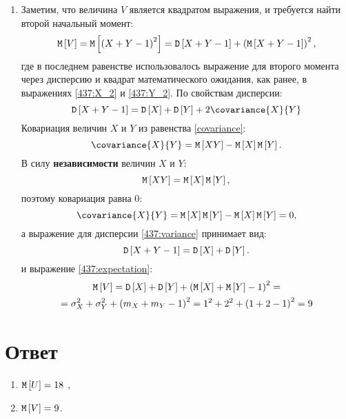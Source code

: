 \documentclass[a4paper,12pt]{article}
\begin{document}
\begin{enumerate}
        \item Заметим, что величина $V$ является квадратом выражения, и требуется найти второй начальный момент:
        \begin{equation}
            \label{437:expectation}
            \mathtt{M} \left [ V \right ] = \mathtt{M} \left [ \left ( X + Y - 1 \right )^2 \right ] = \mathtt{D} \left [ X + Y - 1 \right ] + \left ( \mathtt{M} \left [ X + Y - 1 \right ] \right )^2 ,
        \end{equation}
        где в последнем равенстве использовалось выражение для второго момента через дисперсию и квадрат математического ожидания, как ранее, в выражениях \eqref{437:X_2}
        и \eqref{437:Y_2}.
        По свойствам дисперсии:
        \begin{equation}
            \label{437:variance}
            \variance{X + Y - 1} = \variance{X} + \variance{Y} + 2 \covariance{X}{Y}
        \end{equation}
        Ковариация величин $X$ и $Y$ из равенства \eqref{covariance}:
        \begin{equation}
            \covariance{X}{Y} = \expectation{XY} - \expectation{X} \expectation{Y}.
        \end{equation}
        В силу \textbf{независимости} величин $X$ и $Y$:
        \begin{equation}
            \mathtt{M} \left [ XY \right ] = \mathtt{M} \left [ X \right ] \mathtt{M} \left [ Y \right ] ,
        \end{equation}
        поэтому ковариация равна 0:
        \begin{equation}
            \covariance{X}{Y} = \expectation{X} \expectation{Y} - \expectation{X} \expectation{Y} = 0 ,
        \end{equation}
        а выражение для дисперсии \eqref{437:variance} принимает вид:
        \begin{equation}
            \mathtt{D} \left [ X + Y - 1 \right ] = \mathtt{D} \left [ X \right ] + \mathtt{D} \left [ Y \right ] .
        \end{equation}
        и выражение \eqref{437:expectation}:
        \begin{multline}
            \mathtt{M} \left [ V \right ]
            = \mathtt{D} \left [ X \right ] + \mathtt{D} \left [ Y \right ] + \left ( \mathtt{M} \left [ X \right ] + \mathtt{M} \left [ Y \right ] - 1 \right )^2 = \\
            = \sigma_X^2 + \sigma_Y^2 + \left ( m_X + m_Y - 1 \right )^2
            = 1^2
            + 2^2 + \left ( 1 + 2 - 1 \right )^2
            = 9
        \end{multline}
    \end{enumerate}
    \section*{Ответ}
    \begin{enumerate}
        \item $\mathtt{M} \left [ U \right ] = 18$ ,
        \item $\mathtt{M} \left [ V \right ] = 9$.
    \end{enumerate}
\end{document}

